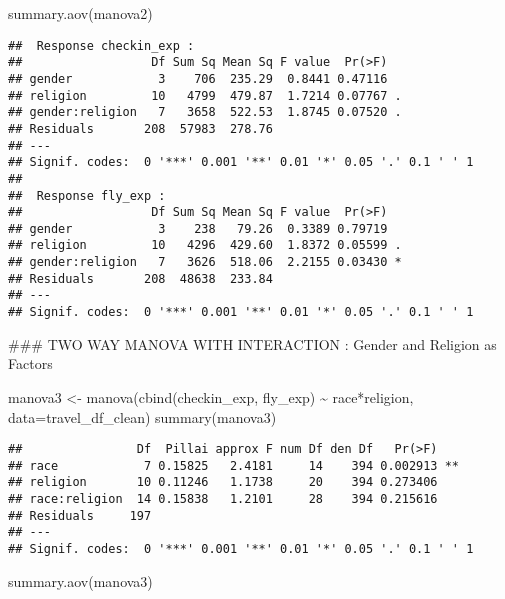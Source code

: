 \documentclass[
]{article}
\newenvironment{Shaded}{\begin{snugshade}}{\end{snugshade}}
\newcommand{\AttributeTok}[1]{\textcolor[rgb]{0.77,0.63,0.00}{#1}}
\newcommand{\FunctionTok}[1]{\textcolor[rgb]{0.00,0.00,0.00}{#1}}
\newcommand{\NormalTok}[1]{#1}
\newcommand{\OtherTok}[1]{\textcolor[rgb]{0.56,0.35,0.01}{#1}}
\newcommand{\SpecialCharTok}[1]{\textcolor[rgb]{0.00,0.00,0.00}{#1}}
\begin{document}
\begin{Shaded}
\begin{Highlighting}[]
\FunctionTok{summary.aov}\NormalTok{(manova2)}
\end{Highlighting}
\end{Shaded}

\begin{verbatim}
##  Response checkin_exp :
##                  Df Sum Sq Mean Sq F value  Pr(>F)  
## gender            3    706  235.29  0.8441 0.47116  
## religion         10   4799  479.87  1.7214 0.07767 .
## gender:religion   7   3658  522.53  1.8745 0.07520 .
## Residuals       208  57983  278.76                  
## ---
## Signif. codes:  0 '***' 0.001 '**' 0.01 '*' 0.05 '.' 0.1 ' ' 1
## 
##  Response fly_exp :
##                  Df Sum Sq Mean Sq F value  Pr(>F)  
## gender            3    238   79.26  0.3389 0.79719  
## religion         10   4296  429.60  1.8372 0.05599 .
## gender:religion   7   3626  518.06  2.2155 0.03430 *
## Residuals       208  48638  233.84                  
## ---
## Signif. codes:  0 '***' 0.001 '**' 0.01 '*' 0.05 '.' 0.1 ' ' 1
\end{verbatim}

\hfill\break
\#\#\# TWO WAY MANOVA WITH INTERACTION : Gender and Religion as Factors

\begin{Shaded}
\begin{Highlighting}[]
\NormalTok{manova3 }\OtherTok{\textless{}{-}} \FunctionTok{manova}\NormalTok{(}\FunctionTok{cbind}\NormalTok{(checkin\_exp, fly\_exp) }\SpecialCharTok{\textasciitilde{}}\NormalTok{ race}\SpecialCharTok{*}\NormalTok{religion, }\AttributeTok{data=}\NormalTok{travel\_df\_clean)}
\FunctionTok{summary}\NormalTok{(manova3)}
\end{Highlighting}
\end{Shaded}

\begin{verbatim}
##                Df  Pillai approx F num Df den Df   Pr(>F)   
## race            7 0.15825   2.4181     14    394 0.002913 **
## religion       10 0.11246   1.1738     20    394 0.273406   
## race:religion  14 0.15838   1.2101     28    394 0.215616   
## Residuals     197                                           
## ---
## Signif. codes:  0 '***' 0.001 '**' 0.01 '*' 0.05 '.' 0.1 ' ' 1
\end{verbatim}

\begin{Shaded}
\begin{Highlighting}[]
\FunctionTok{summary.aov}\NormalTok{(manova3)}
\end{Highlighting}
\end{Shaded}
\end{document}
